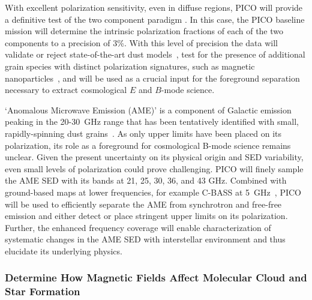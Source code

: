 \documentclass[PICOReport.tex]{subfiles}
\begin{document}
With excellent polarization sensitivity, even in diffuse regions, PICO will provide a definitive test of the two component paradigm \citep{Meisner2015}. 
In this case, the PICO baseline mission will determine the intrinsic polarization fractions of each of the two components to a precision of 3\%. With this level of precision the data will validate or reject state-of-the-art dust models~\citep[e.g.][Hensley \& Draine, in prep]{Guillet2018}, test for the presence of additional grain species with distinct polarization signatures, such as magnetic nanoparticles~\citep{Draine2013}, and will be used as a crucial input for the foreground separation necessary to extract cosmological $E$ and $B$-mode science. 

`Anomalous Microwave Emission (AME)' is a component of Galactic emission peaking in the 20-30~GHz range that has been tentatively identified with small, rapidly-spinning dust grains~\citep{dickinson/etal:2018}. As only upper limits have been placed on its polarization, its role as a foreground for cosmological B-mode science remains unclear. Given the present uncertainty on its physical origin and SED variability, even small levels of polarization could prove challenging. PICO will finely sample the AME SED with its bands at 21, 25, 30, 36, and 43 GHz. Combined with ground-based maps at lower frequencies, for example C-BASS at 5~GHz~\citep{Dickinson2018a}, PICO will be used to efficiently separate the AME from synchrotron and free-free emission and either detect or place stringent upper limits on its polarization. Further, the enhanced frequency coverage will enable characterization of systematic changes in the AME SED with interstellar environment and thus elucidate its underlying physics.

\subsubsection{Determine How Magnetic Fields Affect Molecular Cloud and Star Formation}
\label{sec:magnetic_fields}
\end{document}
